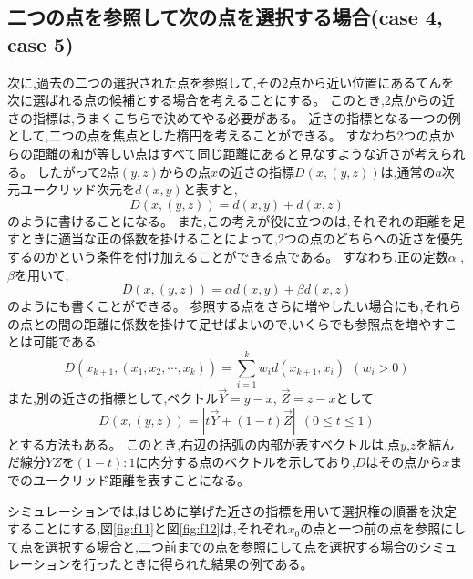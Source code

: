 \subsection{二つの点を参照して次の点を選択する場合(case 4, case 5)}

次に,過去の二つの選択された点を参照して,その2点から近い位置にあるてんを次に選ばれる点の候補とする場合を考えることにする。
このとき,2点からの近さの指標は,うまくこちらで決めてやる必要がある。
近さの指標となる一つの例として,二つの点を焦点とした楕円を考えることができる。
すなわち2つの点からの距離の和が等しい点はすべて同じ距離にあると見なすような近さが考えられる。
したがって2点$(y, z)$からの点$x$の近さの指標$D(x, (y, z))$は,通常の$a$次元ユークリッド次元を$d(x,y)$と表すと,
\[D(x, (y, z)) = d(x,y) + d(x, z)\]
のように書けることになる。
また,この考えが役に立つのは,それぞれの距離を足すときに適当な正の係数を掛けることによって,2つの点のどちらへの近さを優先するのかという条件を付け加えることができる点である。
すなわち,正の定数$\alpha$ ,$\beta$を用いて,
\[D(x, (y, z)) = \alpha d(x,y) + \beta d(x, z)\]
のようにも書くことができる。
参照する点をさらに増やしたい場合にも,それらの点との間の距離に係数を掛けて足せばよいので,いくらでも参照点を増やすことは可能である:
\[D(x_{k+1}, (x_{1}, x_{2}, \cdots , x_{k})) = \sum_{i=1}^{k}w_{i}d(x_{k+1}, x_{i})\ \ (w_{i} > 0)\]
また,別の近さの指標として,ベクトル$\vec{Y} = y-x$, $\vec{Z} = z-x$として
\[D(x, (y,z)) = |t\vec{Y} + (1-t)\vec{Z}|\ \ (0 \le t \le 1)\]
とする方法もある。
このとき,右辺の括弧の内部が表すベクトルは,点$y$,$z$を結んだ線分$YZ$を$(1-t):1$に内分する点のベクトルを示しており,$D$はその点から$x$までのユークリッド距離を表すことになる。

シミュレーションでは,はじめに挙げた近さの指標を用いて選択権の順番を決定することにする,図\ref{fig:f11}と図\ref{fig:f12}は,それぞれ$x_{0}$の点と一つ前の点を参照にして点を選択する場合と,二つ前までの点を参照にして点を選択する場合のシミュレーションを行ったときに得られた結果の例である。

